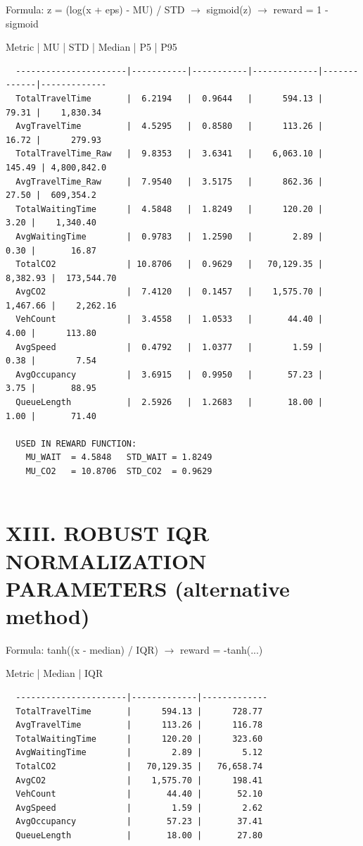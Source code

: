 \documentclass[11pt,a4paper]{article}
\begin{document}
Formula: z = (log(x + eps) - MU) / STD $\rightarrow$ sigmoid(z) $\rightarrow$ reward = 1 - sigmoid

Metric               |    MU      |    STD     | Median      | P5          | P95
\vspace{1em}\begin{verbatim}
  ----------------------|-----------|-----------|-------------|-------------|-------------
  TotalTravelTime       |  6.2194   |  0.9644   |      594.13 |       79.31 |    1,830.34
  AvgTravelTime         |  4.5295   |  0.8580   |      113.26 |       16.72 |      279.93
  TotalTravelTime_Raw   |  9.8353   |  3.6341   |    6,063.10 |      145.49 | 4,800,842.0
  AvgTravelTime_Raw     |  7.9540   |  3.5175   |      862.36 |       27.50 |  609,354.2
  TotalWaitingTime      |  4.5848   |  1.8249   |      120.20 |        3.20 |    1,340.40
  AvgWaitingTime        |  0.9783   |  1.2590   |        2.89 |        0.30 |       16.87
  TotalCO2              | 10.8706   |  0.9629   |   70,129.35 |    8,382.93 |  173,544.70
  AvgCO2                |  7.4120   |  0.1457   |    1,575.70 |    1,467.66 |    2,262.16
  VehCount              |  3.4558   |  1.0533   |       44.40 |        4.00 |      113.80
  AvgSpeed              |  0.4792   |  1.0377   |        1.59 |        0.38 |        7.54
  AvgOccupancy          |  3.6915   |  0.9950   |       57.23 |        3.75 |       88.95
  QueueLength           |  2.5926   |  1.2683   |       18.00 |        1.00 |       71.40

  USED IN REWARD FUNCTION:
    MU_WAIT  = 4.5848   STD_WAIT = 1.8249
    MU_CO2   = 10.8706  STD_CO2  = 0.9629


\end{verbatim}
\section*{XIII. ROBUST IQR NORMALIZATION PARAMETERS (alternative method)}

Formula: tanh((x - median) / IQR) $\rightarrow$ reward = -tanh(...)

Metric               | Median       | IQR
\vspace{1em}\begin{verbatim}
  ----------------------|-------------|-------------
  TotalTravelTime       |      594.13 |      728.77
  AvgTravelTime         |      113.26 |      116.78
  TotalWaitingTime      |      120.20 |      323.60
  AvgWaitingTime        |        2.89 |        5.12
  TotalCO2              |   70,129.35 |   76,658.74
  AvgCO2                |    1,575.70 |      198.41
  VehCount              |       44.40 |       52.10
  AvgSpeed              |        1.59 |        2.62
  AvgOccupancy          |       57.23 |       37.41
  QueueLength           |       18.00 |       27.80


\end{verbatim}
\end{document}
